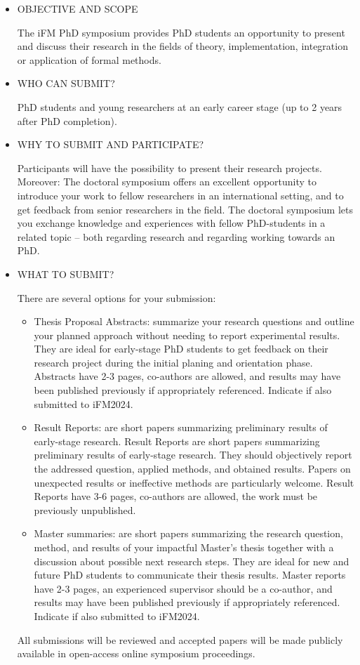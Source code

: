 \documentclass[prodmode,acmtecs]{acmsmall} %
\begin{document}
\begin{itemize}\item  OBJECTIVE AND SCOPE 
 
  The iFM PhD symposium provides PhD students an opportunity to present and discuss their research in the fields of theory, implementation, integration or application of formal methods.  
 
\item  WHO CAN SUBMIT? 
 
  PhD students and young researchers at an early career stage (up to 2 years after PhD completion). 
 
\item  WHY TO SUBMIT AND PARTICIPATE? 
 
  Participants will have the possibility to present their research projects. Moreover: The doctoral symposium offers an excellent opportunity to introduce your work to fellow researchers in an international setting, and to get feedback from senior researchers in the field. The doctoral symposium lets you exchange knowledge and experiences with fellow PhD-students in a related topic -- both regarding research and regarding working towards an PhD.  
 
\item  WHAT TO SUBMIT? 
 
  There are several options for your submission: 
 
\begin{itemize}\item  Thesis Proposal Abstracts: summarize your research questions and outline your planned approach without needing to report experimental results. They are ideal for early-stage PhD students to get feedback on their research project during the initial planing and orientation phase. Abstracts have 2-3 pages, co-authors are allowed, and results may have been published previously if appropriately referenced. Indicate if also submitted to iFM2024.
\item  Result Reports: are short papers summarizing preliminary results of early-stage research.  Result Reports are short papers summarizing preliminary results of early-stage research. They should objectively report the addressed question, applied methods, and obtained results. Papers on unexpected results or ineffective methods are particularly welcome. Result Reports have 3-6 pages, co-authors are allowed, the work must be previously unpublished.
\item  Master summaries: are short papers summarizing the research question, method, and results of your impactful Master's thesis together with a discussion about possible next research steps. They are ideal for new and future PhD students to communicate their thesis results.  Master reports have 2-3 pages, an experienced supervisor should be a co-author, and results may have been published previously if appropriately referenced. Indicate if also submitted to iFM2024.
\end{itemize} 
  All submissions will be reviewed and accepted papers will be made publicly available in open-access online symposium proceedings. 
 

\end{itemize}
\end{document}
